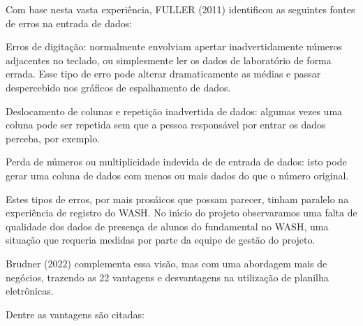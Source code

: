 \documentclass[
12pt,		%
openright,	%
twoside,  %
a4paper,			%
chapter=TITLE,		%
english,			%
french,				%
spanish,			%
brazil				%
]{USPSC-classe/USPSC_RedarTex}
\begin{document}
Com base nesta vasta experi\^encia,  FULLER (2011) identificou as seguintes fontes de erros na entrada de dados:









\begin{alineas}
\item Erros de digita\c{c}\~ao: normalmente envolviam apertar inadvertidamente n\'umeros adjacentes no teclado, ou simplesmente ler os dados de laborat\'orio de forma errada. Esse tipo de erro pode alterar dramaticamente as m\'edias e passar despercebido nos gr\'aficos de espalhamento de dados.
\item Deslocamento de colunas e repeti\c{c}\~ao inadvertida de dados: algumas vezes uma coluna pode ser repetida sem que a pessoa respons\'avel por entrar os dados perceba, por exemplo.
\item Perda de n\'umeros ou multiplicidade indevida de de entrada de dados: isto pode gerar uma coluna de dados com menos ou mais dados do que o n\'umero original.
\end{alineas}

Estes tipos de erros, por mais pros\'aicos que possam parecer, tinham paralelo na experi\^encia de registro do WASH. No in\'{\i}cio do projeto observaramos uma falta de qualidade dos dados de presen\c{c}a de alunos do fundamental no WASH, uma situa\c{c}\~ao que requeria medidas por parte da equipe de gest\~ao do projeto.








 Brudner (2022) complementa essa vis\~ao, mas com uma abordagem mais de neg\'ocios, trazendo as 22 vantagens e desvantagens na utiliza\c{c}\~ao de planilha eletr\^onicas.








Dentre as vantagens s\~ao citadas:
\end{document}
